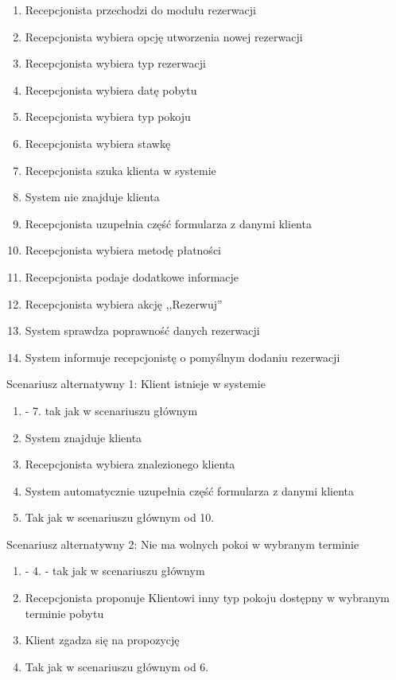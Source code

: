 \documentclass[a4paper,onecolumn,oneside,11pt,wide,floatssmall]{mwrep}
\theoremstyle{definition}
\theoremstyle{plain}%
\theoremstyle{remark}
\begin{document}
\begin{enumerate}
  \item Recepcjonista przechodzi do modułu rezerwacji
  \item Recepcjonista wybiera opcję utworzenia nowej rezerwacji
  \item Recepcjonista wybiera typ rezerwacji
  \item Recepcjonista wybiera datę pobytu
  \item Recepcjonista wybiera typ pokoju
  \item Recepcjonista wybiera stawkę
  \item Recepcjonista szuka klienta w systemie
  \item System nie znajduje klienta 
  \item Recepcjonista uzupełnia część formularza z danymi klienta
  \item Recepcjonista wybiera metodę płatności
  \item Recepcjonista podaje dodatkowe informacje
  \item Recepcjonista wybiera akcję ,,Rezerwuj''
  \item System sprawdza poprawność danych rezerwacji
  \item System informuje recepcjonistę o pomyślnym dodaniu rezerwacji
\end{enumerate}

Scenariusz alternatywny 1: Klient istnieje w systemie

\begin{enumerate}
  \item - 7. tak jak w scenariuszu głównym
  \setcounter{enumi}{7}
  \item System znajduje klienta
  \item Recepcjonista wybiera znalezionego klienta
  \item System automatycznie uzupełnia część formularza z danymi klienta 
  \item Tak jak w scenariuszu głównym od 10.
\end{enumerate}

Scenariusz alternatywny 2: Nie ma wolnych pokoi w wybranym terminie

\begin{enumerate}
  \item - 4. - tak jak w scenariuszu głównym 
  \setcounter{enumi}{4}
  \item Recepcjonista proponuje Klientowi inny typ pokoju dostępny w wybranym terminie pobytu
  \item Klient zgadza się na propozycję
  \item Tak jak w scenariuszu głównym od 6.
\end{enumerate}
\end{document}
